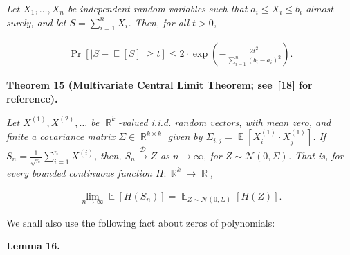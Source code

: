 \emph{Let $X_{1},\dots,X_{n}$ be independent random variables such that $a_{i}\leqslant X_{i}\leqslant b_{i}$ almost surely, and let $S=\sum_{i=1}^{n}X_{i}$.
Then, for all $t>0$,}\par


\[\begin{gathered}
\Pr\left[\left|S-\mathop{\mathbb{E}}\left[S\right]\right|\geqslant t\right]\leqslant 2\cdot\exp\left(-\frac{2t^{2}}{\sum_{i=1}^{n}\left(b_{i}-a_{i}\right)^{2}}\right).
\end{gathered}\]







\par\medskip\noindent\textbf{
\textbf{Theorem 15}\textbf{ }(Multivariate Central Limit Theorem; see [18] for reference)\textbf{.}
}\par



\emph{Let $X^{\left(1\right)},X^{\left(2\right)},\dots$ be $\mathop{\mathbb{R}}^{k}$-valued i.i.d. random vectors, with mean zero, and finite a covariance matrix $\Sigma\in\mathop{\mathbb{R}}^{k\times k}$ given by $\Sigma_{i,j}=\mathop{\mathbb{E}}\left[X^{\left(1\right)}_{i}\cdot X^{\left(1\right)}_{j}\right]$.
If $S_{n}=\frac{1}{\sqrt{n}}\sum_{i=1}^{n}X^{\left(i\right)}$, then, $S_{n}\xrightarrow{\mathcal{D}}Z$ as $n\to\infty$, for $Z\sim\mathcal{N}(0,\Sigma)$.
That is, for every bounded continuous function $H:\mathop{\mathbb{R}}^{k}\to\mathop{\mathbb{R}}$,}\par


\[\begin{gathered}
\lim_{n\to\infty}\mathop{\mathbb{E}}\left[H(S_{n})\right]=\mathop{\mathbb{E}}_{Z\sim\mathcal{N}(0,\Sigma)}\left[H(Z)\right].
\end{gathered}\]






We shall also use the following fact about zeros of polynomials:\par





\par\medskip\noindent\textbf{
\textbf{Lemma 16}\textbf{.}
}\par



